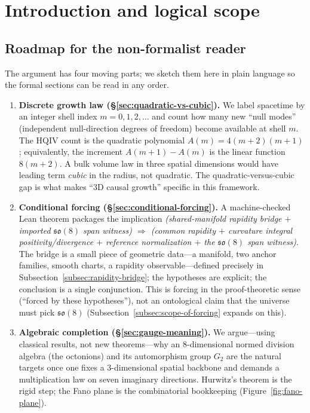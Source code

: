 \documentclass[11pt]{amsart}
\begin{document}


\section{Introduction and logical scope}

\subsection{Roadmap for the non-formalist reader}
\label{subsec:roadmap}

The argument has four moving parts; we sketch them here in plain language so the formal sections can be read in any order.

\begin{enumerate}
  \item \textbf{Discrete growth law (\S\ref{sec:quadratic-vs-cubic}).} We label spacetime by an integer shell index \(m=0,1,2,\dots\) and count how many new ``null modes'' (independent null-direction degrees of freedom) become available at shell \(m\). The HQIV count is the quadratic polynomial \(A(m)=4(m+2)(m+1)\); equivalently, the increment \(A(m+1)-A(m)\) is the linear function \(8(m+2)\). A bulk volume law in three spatial dimensions would have leading term \emph{cubic} in the radius, not quadratic. The quadratic-versus-cubic gap is what makes ``\(3\)D causal growth'' specific in this framework.
  \item \textbf{Conditional forcing (\S\ref{sec:conditional-forcing}).} A machine-checked Lean theorem packages the implication \emph{(shared-manifold rapidity bridge \(+\) imported \(\mathfrak{so}(8)\) span witness) \(\Rightarrow\) (common rapidity \(+\) curvature integral positivity/divergence \(+\) reference normalization \(+\) the \(\mathfrak{so}(8)\) span witness)}. The bridge is a small piece of geometric data---a manifold, two anchor families, smooth charts, a rapidity observable---defined precisely in Subsection~\ref{subsec:rapidity-bridge}; the hypotheses are explicit; the conclusion is a single conjunction. This is forcing in the proof-theoretic sense (``forced by these hypotheses''), not an ontological claim that the universe must pick \(\mathfrak{so}(8)\) (Subsection~\ref{subsec:scope-of-forcing} expands on this).
  \item \textbf{Algebraic completion (\S\ref{sec:gauge-meaning}).} We argue---using classical results, not new theorems---why an \(8\)-dimensional normed division algebra (the octonions) and its automorphism group \(G_2\) are the natural targets once one fixes a \(3\)-dimensional spatial backbone and demands a multiplication law on seven imaginary directions. Hurwitz's theorem is the rigid step; the Fano plane is the combinatorial bookkeeping (Figure~\ref{fig:fano-plane}).

\end{enumerate}
\end{document}
